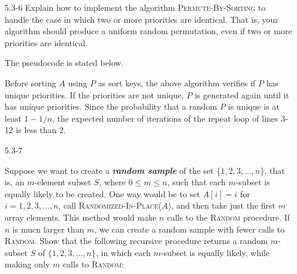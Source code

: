 \begin{enumerate}
\newpage

\item[5.3{-}6]{Explain how to implement the algorithm
\textsc{Permute-By-Sorting} to handle the case in which two or more priorities
are identical. That is, your algorithm should produce a uniform random
permutation, even if two or more priorities are identical.}

\begin{framed}
The pseudocode is stated below.

\begin{algorithm}[H]
\SetAlgoNoEnd\DontPrintSemicolon
\BlankLine
{}
\end{algorithm}

Before sorting $A$ using $P$ as sort keys, the above algorithm verifies if $P$
has unique priorities. If the priorities are not unique, $P$ is generated again
until it has unique priorities. Since the probability that a random $P$ is
unique is at least $1 - 1/n$, the expected number of iterations of the repeat
loop of lines 3-12 is less than $2$.
\end{framed}

\newpage

\item[5.3{-}7]{Suppose we want to create a \textbf{\emph{random sample}} of the
set $\{1, 2, 3, \dots, n\}$, that is, an $m$-element subset $S$, where
$0 \le m \le n$, such that each $m$-subset is equally likely to be created. One
way would be to set $A[i] = i$ for $i = 1, 2, 3, \dots, n$, call
\textsc{Randomized-In-Place}($A$), and then take just the first $m$ array
elements. This method would make $n$ calls to the \textsc{Random} procedure. If
$n$ is mucn larger than $m$, we can create a random sample with fewer calls to
\textsc{Random}. Show that the following recursive procedure returns a random
$m$-subset $S$ of $\{1, 2, 3, \dots, n\}$, in which each $m$-subset is equally
likely, while making only $m$ calls to \textsc{Random}:

\begin{algorithm}[H]
\SetAlgoNoEnd\DontPrintSemicolon
\BlankLine
{}
\end{algorithm}
}


\end{enumerate}
